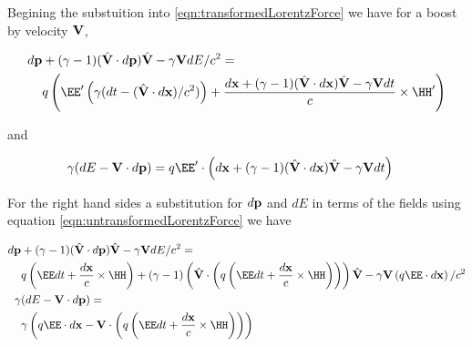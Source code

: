 %
%
%

\renewcommand{\basename}{lorentz_force_tx_2}
\renewcommand{\dirname}{notes/otherbook/}



\beginArtNoToc

\generatetitle{}

Begining the substuition into \ref{eqn:transformedLorentzForce} we have for a boost by velocity $\mathbf{V}$, 

\begin{align*}
d\Bp &+ (\gamma-1)(\Vcap \cdot d\Bp) \Vcap - \gamma \BV dE/c^2 = \\
&q \left( \EE' \left(\gamma ( dt - (\Vcap \cdot d\Bx )/c^2 )\right) + \frac{d\Bx + (\gamma-1)(\Vcap \cdot d\Bx) \Vcap - \gamma \BV dt}{c} \cross \HH' \right)  \\
\end{align*}

and

\begin{align*}
\gamma ( dE - \BV \cdot d\Bp ) &= q \EE' \cdot \left(d\Bx + (\gamma-1)(\Vcap \cdot d\Bx) \Vcap - \gamma \BV dt\right)
\end{align*}

For the right hand sides a substitution for $d\mathbf{p}$ and $dE$ in terms of the fields using equation
\ref{eqn:untransformedLorentzForce} we have


\begin{align*}
d\Bp &+ (\gamma-1)(\Vcap \cdot d\Bp) \Vcap - \gamma \BV dE/c^2 = \\
&q \left( \EE dt + \frac{d\Bx}{c} \cross \HH \right) + (\gamma-1)\left(\Vcap \cdot \left(q \left( \EE dt + \frac{d\Bx}{c} \cross \HH \right)\right)\right) \Vcap - \gamma \BV \left( q \EE \cdot d\Bx \right)/c^2  \\
\gamma &( dE - \BV \cdot d\Bp ) = \\
&\gamma \left( q \EE \cdot d\Bx - \BV \cdot \left(q \left( \EE dt + \frac{d\Bx}{c} \cross \HH \right)\right) \right) 
\end{align*}

